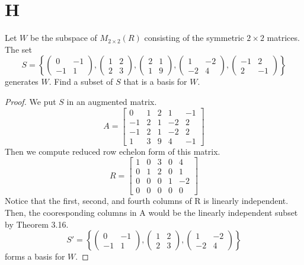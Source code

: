 \documentclass[11pt]{scrartcl}
\begin{document}
\section{H} 
Let $W$ be the subspace of $M_{2 \times 2}(R)$ consisting of the symmetric $2 \times 2$ matrices. The set
$$
S=\left\{\left(\begin{array}{rr}
0 & -1 \\
-1 & 1
\end{array}\right),\left(\begin{array}{cc}
1 & 2 \\
2 & 3
\end{array}\right),\left(\begin{array}{cc}
2 & 1 \\
1 & 9
\end{array}\right),\left(\begin{array}{rr}
1 & -2 \\
-2 & 4
\end{array}\right),\left(\begin{array}{rr}
-1 & 2 \\
2 & -1
\end{array}\right)\right\}
$$
generates $W$. Find a subset of $S$ that is a basis for $W$.
\begin{proof}
We put $S$ in an augmented matrix.
\[
A=
\begin{bmatrix}
	0 & 1 & 2 & 1 & -1 \\
	-1 & 2 & 1 & -2 & 2 \\
	-1 & 2 & 1 & -2 & 2 \\
	1 & 3 & 9 & 4 & -1
\end{bmatrix}
\]
Then we compute reduced row echelon form of this matrix. 
\[
R=
\begin{bmatrix}
	1 & 0 & 3 & 0 & 4\\
	0 & 1 & 2 & 0 & 1\\
	0 & 0 & 0 & 1 & -2 \\
	0 & 0 & 0 & 0 & 0
\end{bmatrix}
\]
Notice that the first, second, and fourth columns of R is linearly independent. 
Then, the cooresponding columns in A would be the linearly independent subset by Theorem 3.16.
\[
S'=\left\{\left(\begin{array}{rr}
	0 & -1 \\
	-1 & 1
	\end{array}\right),\left(\begin{array}{cc}
	1 & 2 \\
	2 & 3
	\end{array}\right),\left(\begin{array}{rr}
	1 & -2 \\
	-2 & 4
	\end{array}\right)\right\}
\]
forms a basis for $W$.
\end{proof}
\end{document}
